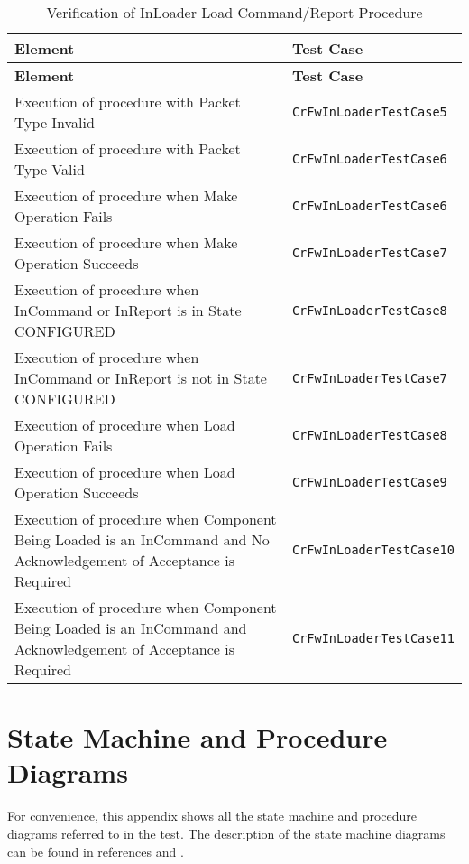 \documentclass{pnp_article}
\begin{document}
\begin{longtable}{|>{\raggedright}p{8.0cm}|P{5.0cm}|}
\caption{Verification of InLoader Load Command/Report Procedure}
\label{tab:verInLoaderLoadCmdRepProc}\\
\hline
{}
\textbf{Element} & \textbf{Test Case} \\
\hline
\endfirsthead
{}
\textbf{Element} & \textbf{Test Case} \\
\hline
\endhead
Execution of procedure with Packet Type Invalid & \texttt{CrFwInLoaderTestCase5}\\
\hline
Execution of procedure with Packet Type Valid & \texttt{CrFwInLoaderTestCase6}\\
\hline
Execution of procedure when Make Operation Fails & \texttt{CrFwInLoaderTestCase6}\\
\hline
Execution of procedure when Make Operation Succeeds & \texttt{CrFwInLoaderTestCase7}\\
\hline
Execution of procedure when InCommand or InReport is in State CONFIGURED & \texttt{CrFwInLoaderTestCase8}\\
\hline
Execution of procedure when InCommand or InReport is not in State CONFIGURED & \texttt{CrFwInLoaderTestCase7}\\
\hline
Execution of procedure when Load Operation Fails & \texttt{CrFwInLoaderTestCase8}\\
\hline
Execution of procedure when Load Operation Succeeds & \texttt{CrFwInLoaderTestCase9}\\
\hline
Execution of procedure when Component Being Loaded is an InCommand and No Acknowledgement of Acceptance is Required & \texttt{CrFwInLoaderTestCase10}\\
\hline
Execution of procedure when Component Being Loaded is an InCommand and Acknowledgement of Acceptance is Required & \texttt{CrFwInLoaderTestCase11}\\
\hline
\end{longtable}

\section{State Machine and Procedure Diagrams}\label{sec:smAndProcDiagrams}
For convenience, this appendix shows all the state machine and procedure diagrams referred to  in the test. The description of the state machine diagrams can be found in references \cite{ref:cordetfw} and \cite{ref:C2Implementation}.
\end{document}
